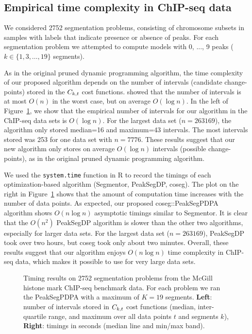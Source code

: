 \documentclass{article}
\begin{document}
\subsection{Empirical time complexity in ChIP-seq data}
\label{sec:results_time}

We considered 2752 segmentation problems, consisting of chromosome
subsets in samples with labels that indicate presence or absence of
peaks. For each segmentation problem we attempted to compute models
with 0, ..., 9 peaks ($k\in\{1,3,\dots,19\}$ segments).

As in the original pruned dynamic programming algorithm, the time
complexity of our proposed algorithm depends on the number of
intervals (candidate change-points) stored in the $C_{k,t}$ cost
functions. \citet{pruned-dp} showed that the number of intervals is at
most $O(n)$ in the worst case, but on average $O(\log n)$. In the left
of Figure~\ref{fig:timings}, we show that the empirical number of
intervals for our algorithm in the ChIP-seq data sets is $O(\log
n)$. For the largest data set ($n=263169$), the algorithm only stored
median=16 and maximum=43 intervals. The most intervals stored was 253
for one data set with $n=7776$. These results suggest that our new
algorithm only stores on average $O(\log n)$ intervals (possible
change-points), as in the original pruned dynamic programming
algorithm.

We used the \verb|system.time| function in R to record the timings of
each optimization-based algorithm (Segmentor, PeakSegDP, coseg). The
plot on the right in Figure~\ref{fig:timings} shows that the amount of
computation time increases with the number of data points. As
expected, our proposed coseg::PeakSegPDPA algorithm shows $O(n\log n)$
asymptotic timings similar to Segmentor. It is clear that the $O(n^2)$
PeakSegDP algorithm is slower than the other two algorithms,
especially for larger data sets. For the largest data set
($n=263169$), PeakSegDP took over two hours, but coseg took only about
two minutes. Overall, these results suggest that our algorithm enjoys
$O(n\log n)$ time complexity in ChIP-seq data, which makes it possible
to use for very large data sets.

\begin{figure}[b!]
  \centering
  \parbox{0.49\textwidth}{
  }
  \parbox{0.49\textwidth}{
  }
  \vskip -0.5cm
  \caption{Timing results on 2752 segmentation problems from the
    McGill histone mark ChIP-seq benchmark data. For each problem we
    ran the PeakSegPDPA with a maximum of $K=19$ segments.
    \textbf{Left}: number of intervals stored in $C_{k,t}$ cost
    functions (median, inter-quartile range, and maximum over all data
    points $t$ and segments $k$), \textbf{Right}: timings in seconds
    (median line and min/max band).}
  \label{fig:timings}
\end{figure}
\end{document}

